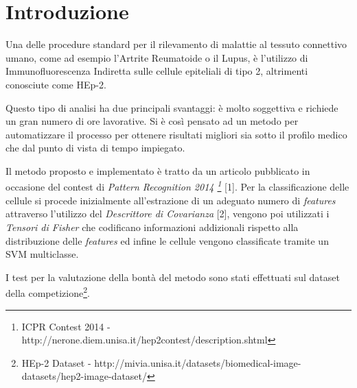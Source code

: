 \section{Introduzione}

Una delle procedure standard per il rilevamento di malattie al tessuto connettivo umano, come ad esempio l'Artrite Reumatoide o il Lupus, è l'utilizzo di Immunofluorescenza Indiretta sulle cellule epiteliali di tipo 2, altrimenti conosciute come HEp-2.

Questo tipo di analisi ha due principali svantaggi: è molto soggettiva e richiede un gran numero di ore lavorative. Si è così pensato ad un metodo per automatizzare il processo per ottenere risultati migliori sia sotto il profilo medico che dal punto di vista di tempo impiegato.

Il metodo proposto e implementato è tratto da un articolo pubblicato in occasione del contest di \emph{Pattern Recognition 2014 \footnote{ICPR Contest 2014 - http://nerone.diem.unisa.it/hep2contest/description.shtml}} [1]. Per la classificazione delle cellule si procede inizialmente all'estrazione di un adeguato numero di \emph{features} attraverso l'utilizzo del \emph{Descrittore di Covarianza} [2], vengono poi utilizzati i \emph{Tensori di Fisher} che codificano informazioni addizionali rispetto alla distribuzione delle \emph{features} ed infine le cellule vengono classificate tramite un SVM multiclasse.

I test per la valutazione della bontà del metodo sono stati effettuati sul dataset della competizione\footnote{HEp-2 Dataset - http://mivia.unisa.it/datasets/biomedical-image-datasets/hep2-image-dataset/}.
